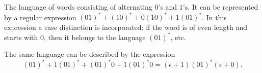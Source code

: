 

\setcounter{section}{2}
\setcounter{subsection}{1}
\setcounter{dfn}{3}

\begin{exl}
The language of words consisting of alternating $0$'s and $1$'s.
It can be represented by a regular expression $(01)^* + (10)^* + 0(10)^* + 1(01)^*$.
In this expression a case distinction is incorporated: if the word is of even length and starts with $0$,
then it belongs to the language $(01)^*$, etc.

The same language can be described by the expression
\[
(01)^* + 1(01)^* + (01)^*0 + 1(01)^*0 = (\epsilon + 1)(01)^*(\epsilon + 0).
\]
\end{exl}


